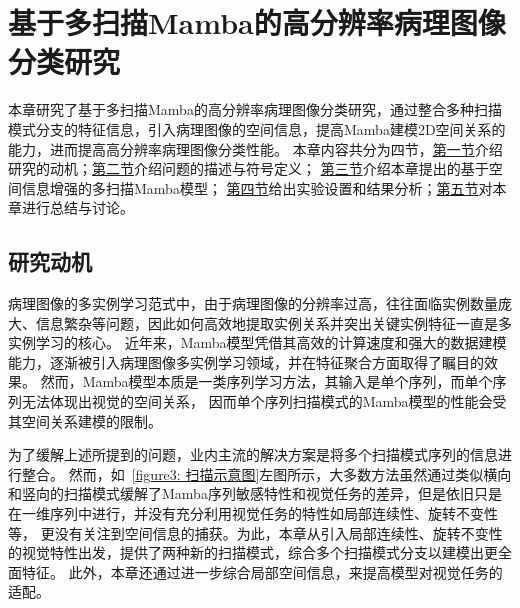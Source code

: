 \chapter[\hspace{0pt}基于多扫描Mamba的高分辨率病理图像分类研究]{{\heiti{}\hspace{0pt}基于多扫描Mamba的高分辨率病理图像分类研究}}\label{chapter3: 基于多扫描Mamba的高分辨率病理图像分类研究}
\removelofgap
\removelotgap
本章研究了基于多扫描Mamba的高分辨率病理图像分类研究，通过整合多种扫描模式分支的特征信息，引入病理图像的空间信息，提高Mamba建模2D空间关系的能力，进而提高高分辨率病理图像分类性能。
本章内容共分为四节，\hyperref[section3: 研究动机]{第一节}介绍研究的动机；\hyperref[section3: 问题描述和符号定义]{第二节}介绍问题的描述与符号定义；
\hyperref[section3: 基于空间信息增强的多扫描Mamba模型]{第三节}介绍本章提出的基于空间信息增强的多扫描Mamba模型；
\hyperref[section3: 实验设置及结果分析]{第四节}给出实验设置和结果分析；\hyperref[section3: 本章小结]{第五节}对本章进行总结与讨论。

\section[\hspace{-2pt}研究动机]{{\heiti{} \hspace{-8pt}研究动机}}\label{section3: 研究动机}


病理图像的多实例学习范式中，由于病理图像的分辨率过高，往往面临实例数量庞大、信息繁杂等问题，因此如何高效地提取实例关系并突出关键实例特征一直是多实例学习的核心。
近年来，Mamba模型凭借其高效的计算速度和强大的数据建模能力，逐渐被引入病理图像多实例学习领域，并在特征聚合方面取得了瞩目的效果。
然而，Mamba模型本质是一类序列学习方法，其输入是单个序列，而单个序列无法体现出视觉的空间关系，
因而单个序列扫描模式的Mamba模型的性能会受其空间关系建模的限制。

为了缓解上述所提到的问题，业内主流的解决方案是将多个扫描模式序列的信息进行整合。
然而，如~\ref{figure3: 扫描示意图}左图所示，大多数方法虽然通过类似横向和竖向的扫描模式缓解了Mamba序列敏感特性和视觉任务的差异，但是依旧只是在一维序列中进行，并没有充分利用视觉任务的特性如局部连续性、旋转不变性等，
更没有关注到空间信息的捕获。为此，本章从引入局部连续性、旋转不变性的视觉特性出发，提供了两种新的扫描模式，综合多个扫描模式分支以建模出更全面特征。
此外，本章还通过进一步综合局部空间信息，来提高模型对视觉任务的适配。

